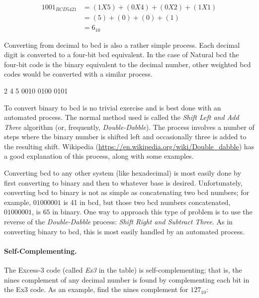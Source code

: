 \begin{align}
  1001_{BCD5421} &= (1X5)+(0X4)+(0X2)+(1X1) \\
  \nonumber
  &= (5)+(0)+(0)+(1) \\
  \nonumber
  &= 6_{10}
\end{align}

Converting from decimal to \gls{bcd} is also a rather simple process. Each decimal digit is converted to a four-bit \gls{bcd} equivalent. In the case of Natural \gls{bcd} the four-bit code is the binary equivalent to the decimal number, other weighted \gls{bcd} codes would be converted with a similar process.

\begin{binDisp}
      2    4    5
    0010 0100 0101
\end{binDisp}


To convert binary to \gls{bcd} is no trivial exercise and is best done with an automated process. The normal method used is called the \emph{Shift Left and Add Three} algorithm (or, frequently, \emph{Double-Dabble}). The process involves a number of steps where the binary number is shifted left and occasionally three is added to the resulting shift. Wikipedia (\url{https://en.wikipedia.org/wiki/Double_dabble}) has a good explanation of this process, along with some examples.

Converting \gls{bcd} to any other system (like hexadecimal) is most easily done by first converting to binary and then to whatever base is desired. Unfortunately, converting \gls{bcd} to binary is not as simple as concatenating two \gls{bcd} numbers; for example, $ 0100 0001 $ is 41 in \gls{bcd}, but those two \gls{bcd} numbers concatenated, $ 01000001 $, is $ 65 $ in binary. One way to approach this type of problem is to use the reverse of the \emph{Double-Dabble} process: \emph{Shift Right and Subtract Three}. As in converting binary to \gls{bcd}, this is most easily handled by an automated process.

\paragraph{Self-Complementing.} The Excess-3 code (called \emph{Ex3} in the table) is self-complementing; that is, the nines complement of any decimal number is found by complementing each bit in the Ex3 code. As an example, find the nines complement for $ 127_{10} $:

